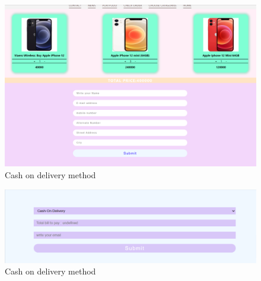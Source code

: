 \begin{figure}[ht]
    \centering  
    \includegraphics[width=\textwidth]{designs/create_order_from_cart.png}    
    \caption{Cash on delivery method}
    \label{fig:fig 6.2.11}
\end{figure}

\begin{figure}[ht]
    \centering  
    \includegraphics[width=\textwidth]{designs/cash-on-delivery-method.png}    
    \caption{Cash on delivery method}
    \label{fig:fig 6.2.12}
\end{figure}

